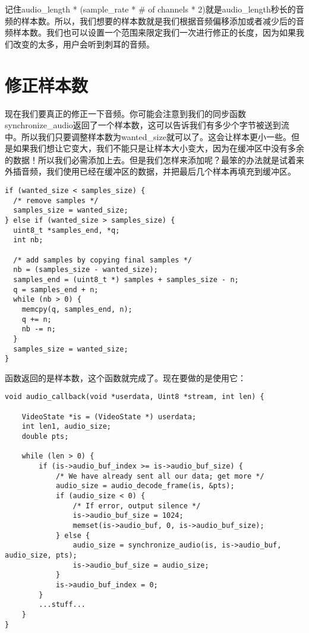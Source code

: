 记住audio_length * (sample_rate * \# of channels * 2)就是audio_length秒长的音频的样本数。所以，我们想要的样本数就是我们根据音频偏移添加或者减少后的音频样本数。我们也可以设置一个范围来限定我们一次进行修正的长度，因为如果我们改变的太多，用户会听到刺耳的音频。

\section{修正样本数}

现在我们要真正的修正一下音频。你可能会注意到我们的同步函数synchronize_audio返回了一个样本数，这可以告诉我们有多少个字节被送到流中。所以我们只要调整样本数为wanted_size就可以了。这会让样本更小一些。但是如果我们想让它变大，我们不能只是让样本大小变大，因为在缓冲区中没有多余的数据！所以我们必需添加上去。但是我们怎样来添加呢？最笨的办法就是试着来外插音频，我们使用已经在缓冲区的数据，并把最后几个样本再填充到缓冲区。

\begin{lstlisting}
if (wanted_size < samples_size) {
  /* remove samples */
  samples_size = wanted_size;
} else if (wanted_size > samples_size) {
  uint8_t *samples_end, *q;
  int nb;

  /* add samples by copying final samples */
  nb = (samples_size - wanted_size);
  samples_end = (uint8_t *) samples + samples_size - n;
  q = samples_end + n;
  while (nb > 0) {
    memcpy(q, samples_end, n);
    q += n;
    nb -= n;
  }
  samples_size = wanted_size;
}
\end{lstlisting}

函数返回的是样本数，这个函数就完成了。现在要做的是使用它：

\begin{lstlisting}
void audio_callback(void *userdata, Uint8 *stream, int len) {

    VideoState *is = (VideoState *) userdata;
    int len1, audio_size;
    double pts;

    while (len > 0) {
        if (is->audio_buf_index >= is->audio_buf_size) {
            /* We have already sent all our data; get more */
            audio_size = audio_decode_frame(is, &pts);
            if (audio_size < 0) {
                /* If error, output silence */
                is->audio_buf_size = 1024;
                memset(is->audio_buf, 0, is->audio_buf_size);
            } else {
                audio_size = synchronize_audio(is, is->audio_buf, audio_size, pts);
                is->audio_buf_size = audio_size;
            }
            is->audio_buf_index = 0;
        }
        ...stuff...
    }
}
\end{lstlisting}

